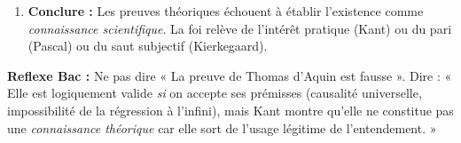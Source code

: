 \documentclass[11pt]{article}
\newcommand{\cle}[1]{{\popxbold\color{popdark}#1}}
\begin{document}
\begin{methode}
\begin{enumerate}
\begin{itemize}
        \item \textbf{Contre la cosmologique :} Elle dépend de l'ontologique (pour passer de « cause nécessaire » à « Dieu = être nécessaire »). Elle applique la catégorie de causalité \emph{au-delà} de l'expérience possible (antinomie de la raison).
        \item \textbf{Contre la physico-théologique :} Elle ne prouve qu'un \emph{Architecte} (demiurge), pas un \emph{Créateur ex nihilo}. L'ordre peut s'expliquer par la nature (évolution, auto-organisation). Analogie faible (monde $\neq$ machine).
    \end{itemize}
    \item \textbf{Conclure :} Les preuves théoriques échouent à établir l'existence comme \emph{connaissance scientifique}. La foi relève de l'\cle{intérêt pratique} (Kant) ou du \cle{pari} (Pascal) ou du \cle{saut subjectif} (Kierkegaard).
\end{enumerate}
\textbf{Reflexe Bac :} Ne pas dire « La preuve de Thomas d'Aquin est fausse ». Dire : « Elle est logiquement valide \emph{si} on accepte ses prémisses (causalité universelle, impossibilité de la régression à l'infini), mais Kant montre qu'elle ne constitue pas une \emph{connaissance théorique} car elle sort de l'usage légitime de l'entendement. »
\end{methode}
\end{document}
